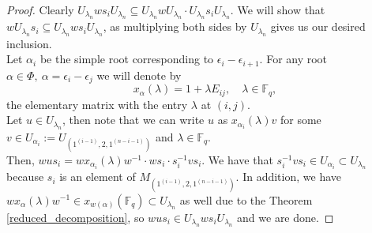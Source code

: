 \documentclass[12pt,reqno]{amsart}
\theoremstyle{definition}
\theoremstyle{remark}
\numberwithin{equation}{section}
\begin{document}

\begin{proof}
    Clearly $U_{\lambda_n} ws_iU_{\lambda_n} \subseteq U_{\lambda_n} w U_{\lambda_n} \cdot U_{\lambda_n} s_iU_{\lambda_n}$. We will show that $wU_{\lambda_n}s_i\subseteq U_{\lambda_n} w s_i U_{\lambda_n}$, as multiplying both sides by $U_{\lambda_n}$ gives us our desired inclusion.\\

    Let $\alpha_i$ be the simple root corresponding to $\epsilon_i-\epsilon_{i+1}$. For any root $\alpha\in \Phi,\ \alpha=\epsilon_i-\epsilon_j$ we will denote by
    \begin{equation}\label{1-dim_subgroup}
        x_{\alpha}(\lambda)=1+\lambda E_{ij}, \quad \lambda\in \mathbb{F}_q,
    \end{equation}
    the elementary matrix with the entry $\lambda$ at $(i,j)$.\\
    
    Let $u \in U_{\lambda_n}$, then note that we can write $u$ as $x_{\alpha_i}(\lambda) v$ for some $v \in U_{\alpha_i}:=U_{(1^{(i-1)},2,1^{(n-i-1)})}$ and $\lambda\in \mathbb{F}_q$.\\

    Then, $wus_i = w x_{\alpha_i}(\lambda) w^{-1} \cdot w s_i \cdot s_i^{-1} v s_i$. We have that $s_i^{-1} v s_i \in U_{\alpha_i}\subset U_{\lambda_n}$ because $s_i$ is an element of $M_{(1^{(i-1)},2,1^{(n-i-1)})}$. In addition, we have $w x_\alpha(\lambda) w^{-1} \in x_{w(\alpha)}(\mathbb{F}_q) \subset U_{\lambda_n}$ as well due to the Theorem \ref{reduced_decomposition}, so $wus_i \in U_{\lambda_n} w s_i U_{\lambda_n}$ and we are done.
\end{proof}


\end{document}
